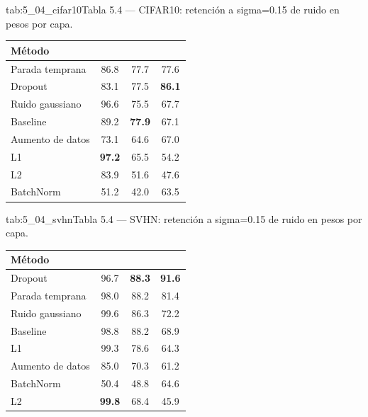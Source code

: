 \begin{table}{tab:5_04_cifar10}{Tabla 5.4 — CIFAR10: retención a sigma=0.15 de ruido en pesos por capa.}
\small
\begin{tabular}{lccc}
\toprule
\textbf{Método} & \textbf{Ret. conv1 (\\%
\midrule
Parada temprana & 86.8 & 77.7 & 77.6 \\
Dropout & 83.1 & 77.5 & \textbf{86.1} \\
Ruido gaussiano & 96.6 & 75.5 & 67.7 \\
Baseline & 89.2 & \textbf{77.9} & 67.1 \\
Aumento de datos & 73.1 & 64.6 & 67.0 \\
L1 & \textbf{97.2} & 65.5 & 54.2 \\
L2 & 83.9 & 51.6 & 47.6 \\
BatchNorm & 51.2 & 42.0 & 63.5 \\
\bottomrule
\end{tabular}
\end{table}

\begin{table}{tab:5_04_svhn}{Tabla 5.4 — SVHN: retención a sigma=0.15 de ruido en pesos por capa.}
\small
\begin{tabular}{lccc}
\toprule
\textbf{Método} & \textbf{Ret. conv1 (\\%
\midrule
Dropout & 96.7 & \textbf{88.3} & \textbf{91.6} \\
Parada temprana & 98.0 & 88.2 & 81.4 \\
Ruido gaussiano & 99.6 & 86.3 & 72.2 \\
Baseline & 98.8 & 88.2 & 68.9 \\
L1 & 99.3 & 78.6 & 64.3 \\
Aumento de datos & 85.0 & 70.3 & 61.2 \\
BatchNorm & 50.4 & 48.8 & 64.6 \\
L2 & \textbf{99.8} & 68.4 & 45.9 \\
\bottomrule
\end{tabular}
\end{table}

